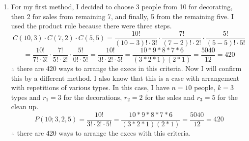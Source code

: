 \documentclass[11pt]{article}
\begin{document}
\begin{enumerate}
					      			\item {
					      				      For my first method, I decided to choose 3 people from 10 for decorating, then 2 for sales from remaining 7, and finally, 5 from the remaining five. I used the product rule  because there were three steps.
					      				      \begin{equation*}
					      				      	C(10,3)\cdot C(7,2)\cdot C(5,5)
					      				      	=\frac{10!}{(10-3)!\cdot 3!}\cdot \frac{7!}{(7-2)!\cdot 2!}
					      				      	\cdot \frac{5!}{(5-5)!\cdot 5!}
					      				      \end{equation*}
					      				      \begin{equation*}
					      				      	=\frac{10!}{7!\cdot 3!}\cdot \frac{7!}{5!\cdot 2!}\cdot \frac{5!}{0!\cdot 5!}
					      				      	=\frac{10!}{3!\cdot 2!\cdot 5!}
					      				      	=\frac{10*9*8*7*6}{(3*2*1)(2*1)}
					      				      	=\frac{5040}{12}
					      				      	=420
					      				      \end{equation*}
					      				      $\therefore$ there are 420 ways to arrange the execs in this criteria. Now I will confirm this by a different method.\newline
					      				      \newline
					      				      I also know that this is a case with arrangement with repetitions of various types. In this case, I have $n=10$ people, $k=3$ types and $r_1=3$ for the decorations, $r_2=2$ for the sales and $r_3=5$ for the clean up.
					      				      \begin{equation*}
					      				      	P(10;3,2,5) = \frac{10!}{3!\cdot 2!\cdot 5!}
					      				      	=\frac{10*9*8*7*6}{(3*2*1)(2*1)}
					      				      	=\frac{5040}{12}
					      				      	=420
					      				      \end{equation*}
					      				      $\therefore$ there are 420 ways to arrange the execs with this criteria.
					      				}
					      			\end{enumerate}
					      			
\end{document}
